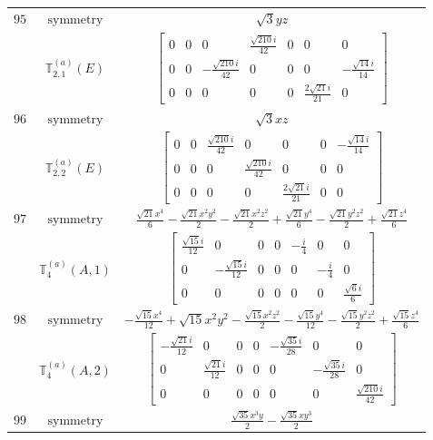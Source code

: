 \documentclass[fleqn,8pt,landscape]{jsarticle}
\begin{document}
\begin{longtable}{ccc}
$ 95 $ & $ \text{symmetry} $ & $ \sqrt{3} y z $ \\
$  $ & $ \mathbb{T}_{2,1}^{(a)}(E) $ & $ \begin{bmatrix} 0 & 0 & 0 & \frac{\sqrt{210} i}{42} & 0 & 0 & 0 \\ 0 & 0 & - \frac{\sqrt{210} i}{42} & 0 & 0 & 0 & - \frac{\sqrt{14} i}{14} \\ 0 & 0 & 0 & 0 & 0 & \frac{2 \sqrt{21} i}{21} & 0 \end{bmatrix} $ \\ \hline
$ 96 $ & $ \text{symmetry} $ & $ \sqrt{3} x z $ \\
$  $ & $ \mathbb{T}_{2,2}^{(a)}(E) $ & $ \begin{bmatrix} 0 & 0 & \frac{\sqrt{210} i}{42} & 0 & 0 & 0 & - \frac{\sqrt{14} i}{14} \\ 0 & 0 & 0 & \frac{\sqrt{210} i}{42} & 0 & 0 & 0 \\ 0 & 0 & 0 & 0 & \frac{2 \sqrt{21} i}{21} & 0 & 0 \end{bmatrix} $ \\ \hline
$ 97 $ & $ \text{symmetry} $ & $ \frac{\sqrt{21} x^{4}}{6} - \frac{\sqrt{21} x^{2} y^{2}}{2} - \frac{\sqrt{21} x^{2} z^{2}}{2} + \frac{\sqrt{21} y^{4}}{6} - \frac{\sqrt{21} y^{2} z^{2}}{2} + \frac{\sqrt{21} z^{4}}{6} $ \\
$  $ & $ \mathbb{T}_{4}^{(a)}(A,1) $ & $ \begin{bmatrix} \frac{\sqrt{15} i}{12} & 0 & 0 & 0 & - \frac{i}{4} & 0 & 0 \\ 0 & - \frac{\sqrt{15} i}{12} & 0 & 0 & 0 & - \frac{i}{4} & 0 \\ 0 & 0 & 0 & 0 & 0 & 0 & \frac{\sqrt{6} i}{6} \end{bmatrix} $ \\ \hline
$ 98 $ & $ \text{symmetry} $ & $ - \frac{\sqrt{15} x^{4}}{12} + \sqrt{15} x^{2} y^{2} - \frac{\sqrt{15} x^{2} z^{2}}{2} - \frac{\sqrt{15} y^{4}}{12} - \frac{\sqrt{15} y^{2} z^{2}}{2} + \frac{\sqrt{15} z^{4}}{6} $ \\
$  $ & $ \mathbb{T}_{4}^{(a)}(A,2) $ & $ \begin{bmatrix} - \frac{\sqrt{21} i}{12} & 0 & 0 & 0 & - \frac{\sqrt{35} i}{28} & 0 & 0 \\ 0 & \frac{\sqrt{21} i}{12} & 0 & 0 & 0 & - \frac{\sqrt{35} i}{28} & 0 \\ 0 & 0 & 0 & 0 & 0 & 0 & \frac{\sqrt{210} i}{42} \end{bmatrix} $ \\ \hline
$ 99 $ & $ \text{symmetry} $ & $ \frac{\sqrt{35} x^{3} y}{2} - \frac{\sqrt{35} x y^{3}}{2} $ \\

\end{longtable}
\end{document}
